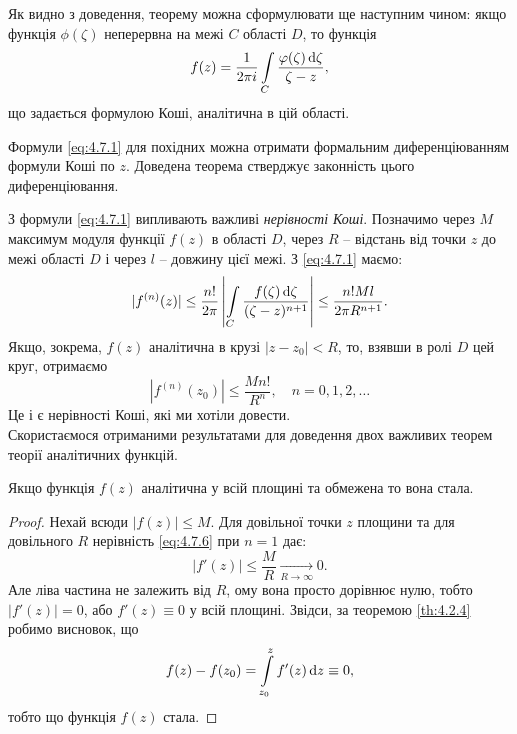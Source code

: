 \begin{remark*}
	Як видно з доведення, теорему можна сформулювати ще наступним чином: якщо функція $\phi(\zeta)$ неперервна на межі $C$ області $D$, то функція
	\begin{equation}
		\label{eq:4.7.4}
		f(z) = \dfrac{1}{2 \pi i} \displaystyle\int\limits_C \dfrac{\varphi(\zeta) \mathop{}\!\mathrm{d} \zeta}{\zeta - z},
	\end{equation}
	що задається формулою Коші, аналітична в цій області.
\end{remark*}

\begin{remark*}
	Формули \eqref{eq:4.7.1} для похідних можна отримати формальним диференціюванням формули Коші по $z$. Доведена теорема стверджує законність цього диференціювання.
\end{remark*}

З формули \eqref{eq:4.7.1} випливають важливі \textit{нерівності Коші}. Позначимо через $M$ максимум модуля функції $f(z)$ в області $D$, через $R$ -- відстань від точки $z$ до межі області $D$ і через $l$ -- довжину цієї межі. З \eqref{eq:4.7.1} маємо:
\begin{equation}
	\label{eq:4.7.5}
	|f^{(n)}(z)| \le \dfrac{n!}{2 \pi} \left| \displaystyle\int\limits_C \dfrac{f(\zeta) \mathop{}\!\mathrm{d} \zeta}{(\zeta - z)^{n + 1}} \right| \le \dfrac{n! M l}{2 \pi R^{n + 1}}.
\end{equation}
Якщо, зокрема, $f(z)$ аналітична в крузі $|z - z_0| < R$, то, взявши в ролі $D$ цей круг, отримаємо
\begin{equation}
	\label{eq:4.7.6}
	|f^{(n)}(z_0)| \le \dfrac{M n!}{R^n}, \quad n = 0, 1, 2, \ldots
\end{equation}
Це і є нерівності Коші, які ми хотіли довести. \\

Скористаємося отриманими результатами для доведення двох важливих теорем теорії аналітичних функцій.

\begin{theorem}[Ж. Ліувіль]
	\label{th:4.7.2}
	Якщо функція $f(z)$ аналітична у всій площині та обмежена то вона стала.
\end{theorem}
\begin{proof}
Нехай всюди $|f(z)| \le M$. Для довільної точки $z$ площини та для довільного $R$ нерівність \eqref{eq:4.7.6} при $n = 1$ дає:
\begin{equation}
	\label{eq:4.7.7}
	|f'(z)| \le \dfrac{M}{R} \xrightarrow[R \to \infty]{} 0.
\end{equation}
Але ліва частина не залежить від $R$, ому вона просто дорівнює нулю, тобто $|f'(z)| = 0$, або $f'(z) \equiv 0$ у всій площині. Звідси, за теоремою \ref{th:4.2.4} робимо висновок, що
\begin{equation}
	\label{eq:4.7.8}
	f(z) - f(z_0) = \displaystyle\int\limits_{z_0}^z f'(z) \mathop{}\!\mathrm{d} z \equiv 0,
\end{equation}
тобто що функція $f(z)$ стала.
\end{proof}

